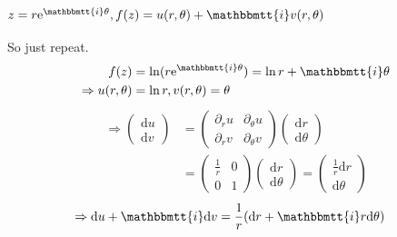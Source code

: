 \documentclass[]{ctexart}
\newcommand{\mi}{\mathbbmtt{i}}
\newcommand{\di}{\mathrm{d}}
\newcommand{\pa}{\partial}
\newcommand{\me}{\mathrm{e}}
\begin{document}
			\subsubsection{$z=r\me ^{\mi \theta},f(z)=u(r,\theta)+\mi v(r,\theta)$}
				So just repeat.
					\begin{equation*}
					\begin{aligned}
						f(z)&=\ln (r\me ^{\mi \theta})=\ln r+\mi \theta\\
						\Rightarrow u(r,\theta)&=\ln r,v(r,\theta)=\theta\\
					\end{aligned}
					\end{equation*}
					\begin{equation*}
					\begin{aligned}
						\Rightarrow 
						\begin{pmatrix}
							\di u\\
							\di v
						\end{pmatrix}
						&=
						\begin{pmatrix}
							\pa_ru & \pa_{\theta}u\\
							\pa_rv & \pa_{\theta}v
						\end{pmatrix}
						\begin{pmatrix}
							\di r\\
							\di \theta
						\end{pmatrix}\\
						&=
						\begin{pmatrix}
							\frac{1}{r} & 0\\
							0 & 1
						\end{pmatrix}
						\begin{pmatrix}
							\di r\\
							\di \theta
						\end{pmatrix}
						=
						\begin{pmatrix}
							\frac{1}{r}\di r\\
							\di\theta
						\end{pmatrix}
					\end{aligned}
					\end{equation*}
					\begin{equation*}
					\begin{aligned}
						\Rightarrow \di u+\mi \di v
						&=\frac{1}{r}(\di r +\mi r \di \theta)
					\end{aligned}
					\end{equation*}
				
\end{document}
